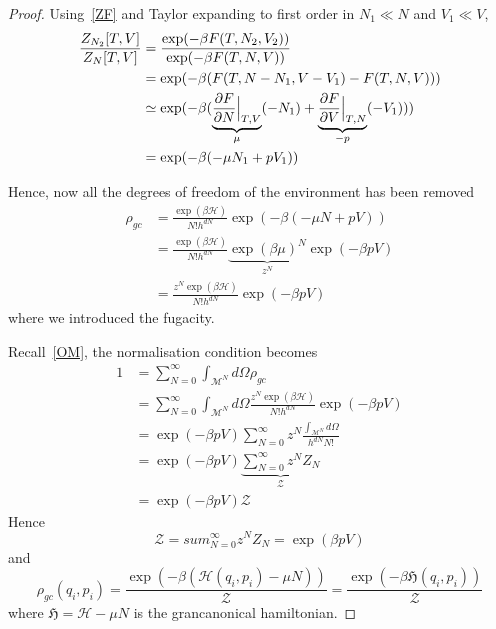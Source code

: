     \begin{proof}
        Using~\eqref{ZF} and Taylor expanding to first order in $N_1 \ll N$ and $V_1 \ll V$, 
        \begin{equation*}
        \begin{aligned}
                \frac{Z_{N_2}[T, V]}{Z_N[T, V]} & = \frac{\exp(-\beta F(T, N_2, V_2))}{\exp(-\beta F(T, N, V))} \\ & = \exp(-\beta (F(T, N-N_1, V-V_1) - F(T, N, V))) \\ & \simeq \exp(-\beta(\underbrace{\frac{\partial F}{\partial N} \Big \vert_{T, V}}_{\mu} (-N_1) + \underbrace{\frac{\partial F}{\partial V} \Big \vert_{T, N}}_{-p} (-V_1))) \\ & = \exp(-\beta(-\mu N_1 + p V_1))
        \end{aligned}
        \end{equation*}

        Hence, now all the degrees of freedom of the environment has been removed
        \begin{equation*}
        \begin{aligned}
            \rho_{gc} & = \frac{\exp(\beta \mathcal H)}{N! h^{dN}} \exp (-\beta (-\mu N + p V)) \\ & = \frac{\exp(\beta \mathcal H)}{N! h^{dN}} \underbrace{\exp ( \beta \mu)^N}_{z^N} \exp(-\beta p V) \\ & = \frac{z^N \exp(\beta \mathcal H)}{N! h^{dN}} \exp(-\beta p V)
        \end{aligned}
        \end{equation*}
        where we introduced the fugacity.
        
        Recall~\eqref{OM}, the normalisation condition becomes 
        \begin{equation*}
        \begin{aligned}
            1 & = \sum_{N=0}^{\infty} \int_{\mathcal M^N} d\Omega \rho_{gc} \\ & = \sum_{N=0}^{\infty} \int_{\mathcal M^N} d\Omega \frac{z^N \exp(\beta \mathcal H)}{N! h^{dN}} \exp(-\beta p V) \\ & = \exp(-\beta p V) \sum_{N=0}^{\infty} z^N \frac{\int_{\mathcal M^N} d\Omega}{h^{dN} N!} \\ & = \exp(-\beta p V) \underbrace{\sum_{N=0}^{\infty} z^N Z_N}_{\mathcal Z} \\ & = \exp(-\beta p V) \mathcal Z
        \end{aligned}
        \end{equation*}
        Hence 
        \begin{equation*}
            \mathcal Z = sum_{N=0}^{\infty} z^N Z_N = \exp(\beta p V)
        \end{equation*}
        and 
        \begin{equation*}
            \rho_{gc} (q_i, p_i) = \frac{\exp(-\beta (\mathcal H(q_i, p_i) - \mu N))}{\mathcal Z} = \frac{\exp(-\beta \mathfrak H(q_i, p_i) )}{\mathcal Z}
        \end{equation*}
        where $\mathfrak H = \mathcal H - \mu N$ is the grancanonical hamiltonian.
    \end{proof}

